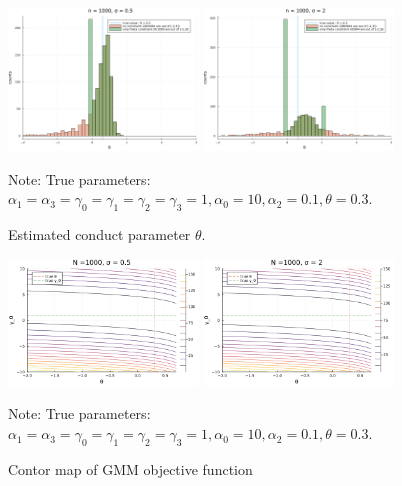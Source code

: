 \documentclass[11pt, a4paper]{article}
\begin{document}
\begin{figure}[!ht]
  \begin{center}
  \includegraphics[width = 0.45\textwidth]
  {figuretable/histogram_loglinear_loglinear_n_1000_sigma_0.5.png}
  \includegraphics[width = 0.45\textwidth]
  {figuretable/histogram_loglinear_loglinear_n_1000_sigma_2.png}
  \caption{Estimated conduct parameter $\theta$.}
  \label{fg:histogram_loglinear_loglinear_n_1000_sigma_2} 
  \end{center}
  \footnotesize
  Note: True parameters: $\alpha_1 = \alpha_3 = \gamma_0 = \gamma_1 = \gamma_2  = \gamma_3 = 1, \alpha_0 = 10, \alpha_2 = 0.1,  \theta = 0.3.$
\end{figure} 

\begin{figure}[!ht]
  \begin{center}
  \includegraphics[width = 0.45\textwidth]
  {figuretable/contour_loglinear_loglinear_n_1000_sigma_0.5.png}
  \includegraphics[width = 0.45\textwidth]
  {figuretable/contour_loglinear_loglinear_n_1000_sigma_2.png}
  \caption{Contor map of GMM objective function}
  \label{fg:contour_loglinear_loglinear_n_1000_sigma_2} 
  \end{center}
  \footnotesize
  Note: True parameters: $\alpha_1 = \alpha_3 = \gamma_0 = \gamma_1 = \gamma_2  = \gamma_3 = 1, \alpha_0 = 10, \alpha_2 = 0.1,  \theta = 0.3.$
\end{figure} 
\end{document}
